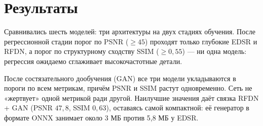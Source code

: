 \chapter{Результаты}
\label{chap:results}

Сравнивались шесть моделей: три архитектуры на двух стадиях обучения. После регрессионной стадии порог по PSNR ($\geq 45$) проходят только глубокие EDSR и RFDN, а порог по структурному сходству SSIM ($\geq 0{,}55$) — ни одна модель: регрессия ожидаемо сглаживает высокочастотные детали.

После состязательного дообучения (GAN) все три модели укладываются в пороги по всем метрикам, причём PSNR и SSIM растут одновременно. Сеть не «жертвует» одной метрикой ради другой. Наилучшие значения даёт связка RFDN + GAN (PSNR $47{,}8$, SSIM $0{,}63$), оставаясь самой компактной: её генератор в формате ONNX занимает около 3 МБ против 5,8 МБ у EDSR.